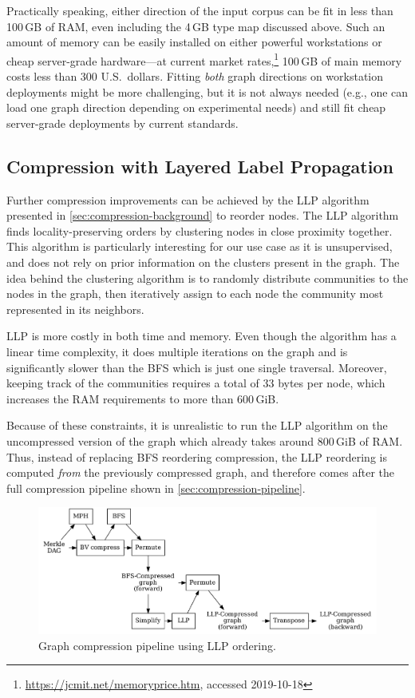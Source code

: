 Practically speaking, either direction of the input corpus can be fit in less
than 100\,GB of RAM, even including the 4\,GB type map discussed above. Such an
amount of memory can be easily installed on either powerful workstations or
cheap server-grade hardware---at current market
rates,\footnote{\url{https://jcmit.net/memoryprice.htm}, accessed 2019-10-18}
100\,GB of main memory costs less than 300 U.S.~dollars. Fitting \emph{both}
graph directions on workstation deployments might be more challenging, but it
is not always needed (e.g., one can load one graph direction depending on
experimental needs) and still fit cheap server-grade deployments by current
standards.

\subsection{Compression with Layered Label Propagation}%
\label{sec:llp-compression}

Further compression improvements can be achieved by the \acrfull{LLP}
algorithm~\cite{BRSLLP} presented in \cref{sec:compression-background}
to reorder nodes. The \gls{LLP} algorithm finds locality-preserving orders by
clustering nodes in close proximity together.  This algorithm is particularly
interesting for our use case as it is unsupervised, and does not rely on prior
information on the clusters present in the graph. The idea behind the
clustering algorithm is to randomly distribute communities to the nodes in the
graph, then iteratively assign to each node the community most represented in
its neighbors.

\gls{LLP} is more costly in both time and memory. Even though the algorithm has
a linear time complexity, it does multiple iterations on the graph and is
significantly slower than the \gls{BFS} which is just one single traversal.
Moreover, keeping track of the communities requires a total of 33 bytes per
node, which increases the RAM requirements to more than 600\,GiB.

Because of these constraints, it is unrealistic to run the \gls{LLP} algorithm
on the uncompressed version of the graph which already takes around 800\,GiB of
RAM. Thus, instead of replacing \gls{BFS} reordering compression, the \gls{LLP}
reordering is computed \emph{from} the previously compressed graph, and
therefore comes after the full compression pipeline shown in
\cref{sec:compression-pipeline}.

\begin{figure}
  \centering
  \includegraphics[width=\linewidth]{img/compression/compression_steps_llp}
    \caption{Graph compression pipeline using \gls{LLP} ordering.}%
  \label{fig:llp-compression-pipeline}
\end{figure}

